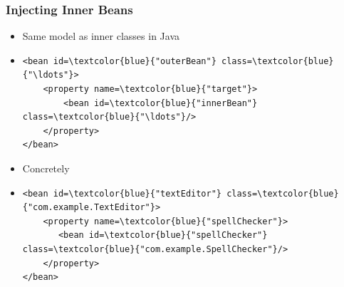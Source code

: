 \documentclass[10pt,xcolor=pdflatex, table]{beamer}
\begin{document}
\begin{frame}[fragile]\frametitle{Injecting Inner Beans}
	\begin{itemize}
		\item Same model as inner classes in Java
        \item[] \begin{Verbatim}[fontsize=\footnotesize, commandchars=\\\{\}]
<bean id=\textcolor{blue}{"outerBean"} class=\textcolor{blue}{"\ldots"}>
    <property name=\textcolor{blue}{"target"}>
        <bean id=\textcolor{blue}{"innerBean"} class=\textcolor{blue}{"\ldots"}/>
    </property>
</bean>
            \end{Verbatim}
		\item Concretely
        \item[] \begin{Verbatim}[fontsize=\footnotesize, commandchars=\\\{\}]
<bean id=\textcolor{blue}{"textEditor"} class=\textcolor{blue}{"com.example.TextEditor"}>
    <property name=\textcolor{blue}{"spellChecker"}>
       <bean id=\textcolor{blue}{"spellChecker"} class=\textcolor{blue}{"com.example.SpellChecker"}/>
    </property>
</bean>
            \end{Verbatim}
	\end{itemize}
\end{frame}
\end{document}
